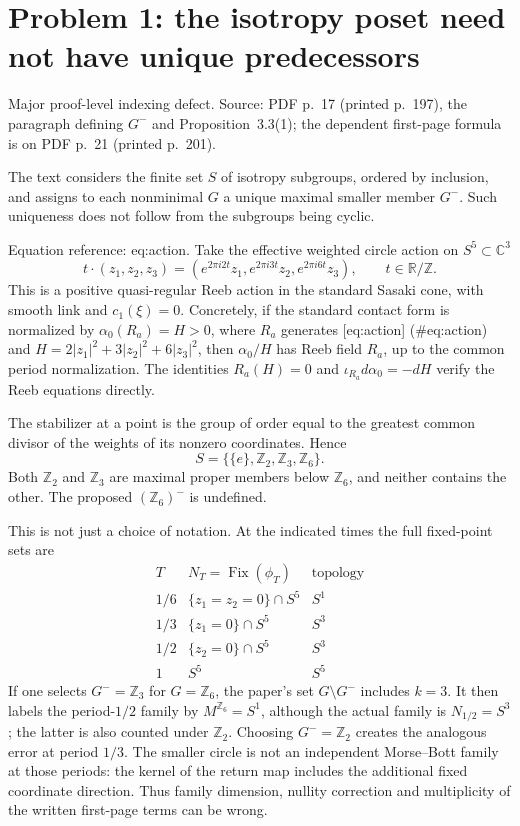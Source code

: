 \documentclass[10pt]{article}
\begin{document}
\section*{Problem 1: the isotropy poset need not have unique predecessors}
Major proof-level indexing defect. Source: PDF p. 17 (printed p. 197), the paragraph defining \(G^-\) and Proposition 3.3(1); the dependent first-page formula is on PDF p. 21 (printed p. 201).\par
The text considers the finite set \(S\) of isotropy subgroups, ordered by inclusion, and assigns to each nonminimal \(G\) a unique maximal smaller member \(G^-\). Such uniqueness does not follow from the subgroups being cyclic.\par
Equation reference: eq:action. Take the effective weighted circle action on \(S^5\subset\mathbb C^3\) \[
 t\cdot(z_1,z_2,z_3)
 =(e^{2\pi i2t}z_1,e^{2\pi i3t}z_2,e^{2\pi i6t}z_3),
 \qquad t\in\mathbb R/\mathbb Z.\] This is a positive quasi-regular Reeb action in the standard Sasaki cone, with smooth link and \(c_1(\xi)=0\). Concretely, if the standard contact form is normalized by \(\alpha_0(R_a)=H>0\), where \(R_a\) generates [eq:action] (\#eq:action) and \(H=2|z_1|^2+3|z_2|^2+6|z_3|^2\), then \(\alpha_0/H\) has Reeb field \(R_a\), up to the common period normalization. The identities \(R_a(H)=0\) and \(\iota_{R_a}d\alpha_0=-dH\) verify the Reeb equations directly.\par
The stabilizer at a point is the group of order equal to the greatest common divisor of the weights of its nonzero coordinates. Hence \[S=\{\{e\},\mathbb Z_2,\mathbb Z_3,\mathbb Z_6\}.\] Both \(\mathbb Z_2\) and \(\mathbb Z_3\) are maximal proper members below \(\mathbb Z_6\), and neither contains the other. The proposed \((\mathbb Z_6)^-\) is undefined.\par
This is not just a choice of notation. At the indicated times the full fixed-point sets are \[\begin{array}{c|c|c}
T&N_T=\operatorname{Fix}(\phi_T)&\text{topology}\\ \hline
1/6&\{z_1=z_2=0\}\cap S^5&S^1\\
1/3&\{z_1=0\}\cap S^5&S^3\\
1/2&\{z_2=0\}\cap S^5&S^3\\
1&S^5&S^5
\end{array}\] If one selects \(G^-=\mathbb Z_3\) for \(G=\mathbb Z_6\), the paper’s set \(G\setminus G^-\) includes \(k=3\). It then labels the period-\(1/2\) family by \(M^{\mathbb Z_6}=S^1\), although the actual family is \(N_{1/2}=S^3\); the latter is also counted under \(\mathbb Z_2\). Choosing \(G^-=\mathbb Z_2\) creates the analogous error at period \(1/3\). The smaller circle is not an independent Morse–Bott family at those periods: the kernel of the return map includes the additional fixed coordinate direction. Thus family dimension, nullity correction and multiplicity of the written first-page terms can be wrong.\par
\end{document}
